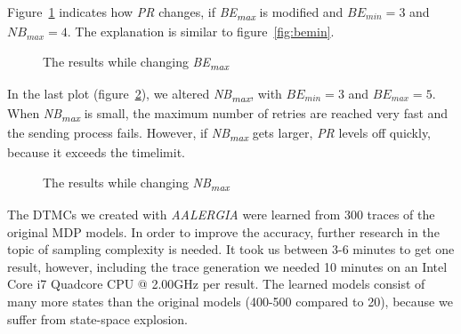 \documentclass[
a4paper,
12pt
]{scrartcl}
\begin{document}
Figure~\ref{fig:bemax} indicates how \textit{PR} changes, if \textit{BE\textsubscript{max}} is modified and $BE_{min}=3$ and $NB_{max}=4$. The explanation is similar to figure~\ref{fig:bemin}.

\begin{figure}[H]
\centering
 \caption{The results while changing \textit{BE\textsubscript{max}}}
    \label{fig:bemax}
\end{figure}

In the last plot (figure~\ref{fig:nbmax}), we altered \textit{NB\textsubscript{max}}, with $BE_{min}=3$ and $BE_{max}=5$. When \textit{NB\textsubscript{max}} is small, the maximum number of retries are reached very fast and the sending process fails. However, if \textit{NB\textsubscript{max}} gets larger, \textit{PR} levels off quickly, because it exceeds the timelimit.

\begin{figure}[H]
\centering
 \caption{The results while changing \textit{NB\textsubscript{max}}}
   \label{fig:nbmax}
\end{figure}

The DTMCs we created with \emph{AALERGIA} were learned from 300 traces of the original MDP models. In order to improve the accuracy, further research in the topic of sampling complexity is needed. It took us between 3-6 minutes to get one result, however, including the trace generation we needed 10 minutes on an Intel Core i7 Quadcore CPU @ 2.00GHz per result. The learned  models consist of many more states than the original models (400-500 compared to 20), because we suffer from state-space explosion.
\end{document}
